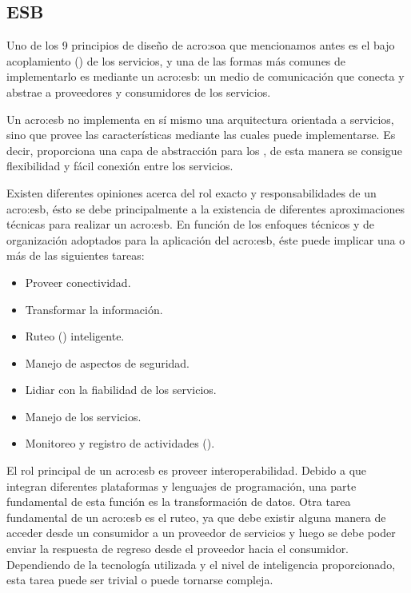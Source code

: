 
\subsection{ESB}
\label{esb:introduccion}

Uno de los 9 principios de diseño de \gls{acro:soa} que mencionamos antes es el bajo acoplamiento () de los servicios, y una de las formas más comunes de implementarlo es mediante un \gls{acro:esb}: un medio de comunicación que conecta y abstrae a proveedores y consumidores de los servicios.

Un \gls{acro:esb} no implementa en sí mismo una arquitectura orientada a servicios, sino que provee las características mediante las cuales puede implementarse. Es decir, proporciona una capa de abstracción para los , de esta manera se consigue flexibilidad y fácil conexión entre los servicios.

Existen diferentes opiniones acerca del rol exacto y responsabilidades de un \gls{acro:esb}, ésto se debe principalmente a la existencia de diferentes aproximaciones técnicas para realizar un \gls{acro:esb}\cite[p.~47]{josuttis2007}.  En función de los enfoques técnicos y de organización adoptados para la aplicación del \gls{acro:esb}, éste puede implicar una o más de las siguientes tareas:

\begin{itemize}
  \item Proveer conectividad.
  \item Transformar la información.
  \item Ruteo () inteligente.
  \item Manejo de aspectos de seguridad.
  \item Lidiar con la fiabilidad de los servicios.
  \item Manejo de los servicios.
  \item Monitoreo y registro de actividades ().
\end{itemize}

El rol principal de un \gls{acro:esb} es proveer interoperabilidad. Debido a que integran diferentes plataformas y lenguajes de programación, una parte fundamental de esta función es la transformación de datos. Otra tarea fundamental de un \gls{acro:esb} es el ruteo, ya que debe existir alguna manera de acceder desde un consumidor a un proveedor de servicios y luego se debe poder enviar la respuesta de regreso desde el proveedor hacia el consumidor. Dependiendo de la tecnología utilizada y el nivel de inteligencia proporcionado, esta tarea puede ser trivial o puede tornarse compleja.

